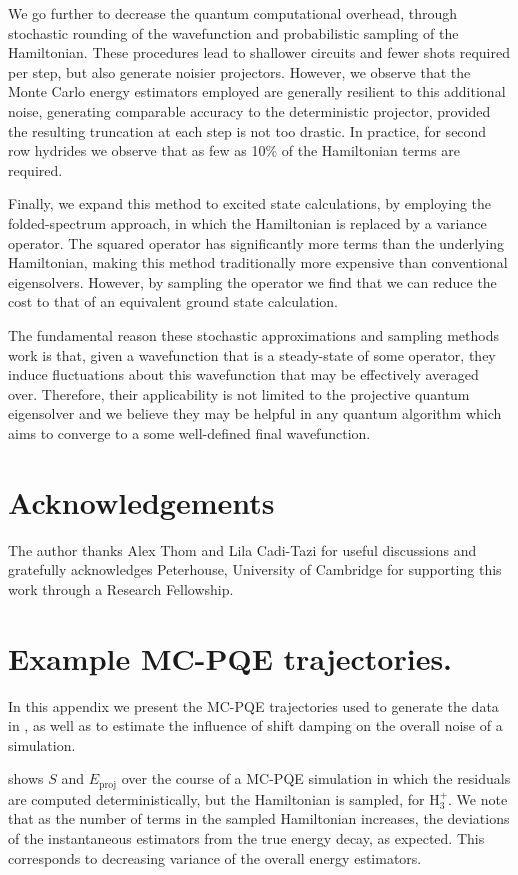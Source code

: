 \documentclass[%
 reprint,
 amsmath,amssymb,
 aps,
]{revtex4-2}
\begin{document}
{We go further to decrease the quantum computational overhead, through stochastic rounding of the wavefunction and probabilistic sampling of the Hamiltonian. These procedures lead to shallower circuits and fewer shots required per step, but also generate noisier projectors.  However, we observe that the Monte Carlo energy estimators employed are generally resilient to this additional noise, generating comparable accuracy to the deterministic projector, provided the resulting truncation at each step is not too drastic. In practice, for second row hydrides we observe that as few as 10\% of the Hamiltonian terms are required.

Finally, we expand this method to excited state calculations, by employing the folded-spectrum approach, in which the Hamiltonian is replaced by a variance operator.  The squared operator has significantly more terms than the underlying Hamiltonian, making this method traditionally more expensive than conventional eigensolvers. However, by sampling the operator we find that we can reduce the cost to that of an equivalent ground state calculation.

The fundamental reason these stochastic approximations and sampling methods work is that, given a wavefunction that is a steady-state of some operator, they induce fluctuations about this wavefunction that may be effectively averaged over. Therefore, their applicability is not limited to the projective quantum eigensolver and we believe they may be helpful in any quantum algorithm which aims to converge to a some well-defined final wavefunction.

\section*{Acknowledgements}
The author thanks Alex Thom and Lila Cadi-Tazi for useful discussions and gratefully acknowledges Peterhouse, University of Cambridge for supporting this work through a Research Fellowship.


\appendix
\section{Example MC-PQE trajectories.}


In this appendix we present the MC-PQE trajectories used to generate the data in , as well as to estimate the influence of shift damping on the overall noise of a simulation. 

 shows $S$ and $E_\mathrm{proj}$ over the course of a MC-PQE simulation in which the residuals are computed deterministically, but the Hamiltonian is sampled, for H$_3^+$. We note that as the number of terms in the sampled Hamiltonian increases, the deviations of the instantaneous estimators from the true energy decay, as expected. This corresponds to decreasing variance of the overall energy estimators.

}
\end{document}
